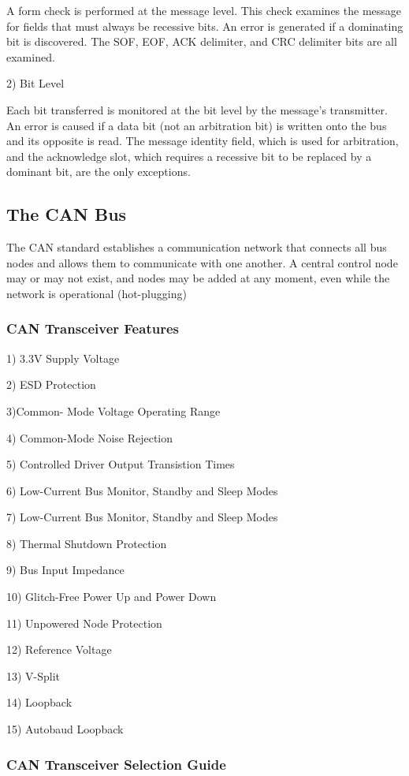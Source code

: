 A form check is performed at the message level. This check examines the message for fields that must always be recessive bits. An error is generated if a dominating bit is discovered. The SOF, EOF, ACK delimiter, and CRC delimiter bits are all examined.

2) Bit Level


Each bit transferred is monitored at the bit level by the message's transmitter. An error is caused if a data bit (not an arbitration bit) is written onto the bus and its opposite is read. The message identity field, which is used for arbitration, and the acknowledge slot, which requires a recessive bit to be replaced by a dominant bit, are the only exceptions.

\subsection{The CAN Bus}

The CAN standard establishes a communication network that connects all bus nodes and allows them to communicate with one another. A central control node may or may not exist, and nodes may be added at any moment, even while the network is operational (hot-plugging)

\subsubsection{CAN Transceiver Features}

1) 3.3V Supply Voltage

2) ESD Protection

3)Common- Mode Voltage Operating Range

4) Common-Mode Noise Rejection

5) Controlled Driver Output Transistion Times

6) Low-Current Bus Monitor, Standby and Sleep Modes

7) Low-Current Bus Monitor, Standby and Sleep Modes

8) Thermal Shutdown Protection

9)  Bus Input Impedance

10)  Glitch-Free Power Up and Power Down

11)  Unpowered Node Protection

12) Reference Voltage

13) V-Split

14) Loopback

15) Autobaud Loopback


\subsubsection{CAN Transceiver Selection Guide }



 